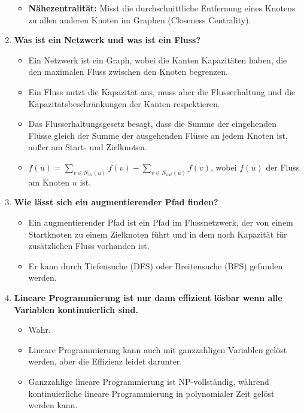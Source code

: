\documentclass[12pt]{scrartcl}
\begin{document}
\begin{enumerate}
\begin{itemize}
              \item \textbf{Nähezentralität:} Misst die durchschnittliche Entfernung eines Knotens zu allen anderen Knoten im Graphen (Closeness Centrality).
          \end{itemize}
    \item \textbf{Was ist ein Netzwerk und was ist ein Fluss?}
          \begin{itemize}
              \item Ein Netzwerk ist ein Graph, wobei die Kanten Kapazitäten haben, die den maximalen Fluss zwischen den Knoten begrenzen.
              \item Ein Fluss nutzt die Kapazität aus, muss aber die Flusserhaltung und die Kapazitätsbeschränkungen der Kanten respektieren.
              \item Das Flusserhaltungsgesetz besagt, dass die Summe der eingehenden Flüsse gleich der Summe der ausgehenden Flüsse an jedem Knoten ist, außer am Start- und Zielknoten.
              \item $f(u) = \sum_{v \in N_{in}(u)} f(v) - \sum_{v \in N_{out}(u)} f(v)$, wobei $f(u)$ der Fluss am Knoten $u$ ist.
          \end{itemize}
    \item \textbf{Wie lässt sich ein augmentierender Pfad finden?}
          \begin{itemize}
              \item Ein augmentierender Pfad ist ein Pfad im Flussnetzwerk, der von einem Startknoten zu einem Zielknoten führt und in dem noch Kapazität für zusätzlichen Fluss vorhanden ist.
              \item Er kann durch Tiefensuche (DFS) oder Breitensuche (BFS) gefunden werden.
          \end{itemize}
    \item \textbf{Lineare Programmierung ist nur dann effizient lösbar wenn alle Variablen kontinuierlich sind.}
          \begin{itemize}
              \item Wahr.
              \item Lineare Programmierung kann auch mit ganzzahligen Variablen gelöst werden, aber die Effizienz leidet darunter.
              \item Ganzzahlige lineare Programmierung ist NP-vollständig, während kontinuierliche lineare Programmierung in polynomialer Zeit gelöst werden kann.
          \end{itemize}
\end{enumerate}
\end{document}
